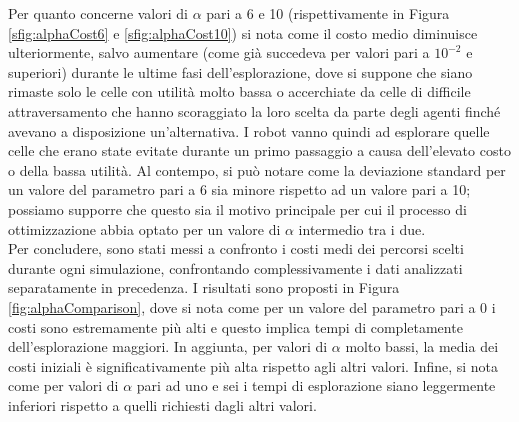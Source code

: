 Per quanto concerne valori di $\alpha$ pari a 6 e 10 (rispettivamente in Figura \ref{sfig:alphaCost6} e \ref{sfig:alphaCost10}) si nota come il costo medio diminuisce ulteriormente, salvo aumentare (come già succedeva per valori pari a $10^{-2}$ e superiori) durante le ultime fasi dell'esplorazione, dove si suppone che siano rimaste solo le celle con utilità molto bassa o accerchiate da celle di difficile attraversamento che hanno scoraggiato la loro scelta da parte degli agenti finché avevano a disposizione un'alternativa. I robot vanno quindi ad esplorare quelle celle che erano state evitate durante un primo passaggio a causa dell'elevato costo o della bassa utilità.
Al contempo, si può notare come la deviazione standard per un valore del parametro pari a 6 sia minore rispetto ad un valore pari a 10; possiamo supporre che questo sia il motivo principale per cui il processo di ottimizzazione abbia optato per un valore di $\alpha$ intermedio tra i due.\\
Per concludere, sono stati messi a confronto i costi medi dei percorsi scelti durante ogni simulazione, confrontando complessivamente i dati analizzati separatamente in precedenza.
I risultati sono proposti in Figura \ref{fig:alphaComparison}, dove si nota come per un valore del parametro pari a 0 i costi sono estremamente più alti e questo implica tempi di completamente dell'esplorazione maggiori. In aggiunta, per valori di $\alpha$ molto bassi, la media dei costi iniziali è significativamente più alta rispetto agli altri valori.
Infine, si nota come per valori di $\alpha$ pari ad uno e sei i tempi di esplorazione siano leggermente inferiori rispetto a quelli richiesti dagli altri valori.

